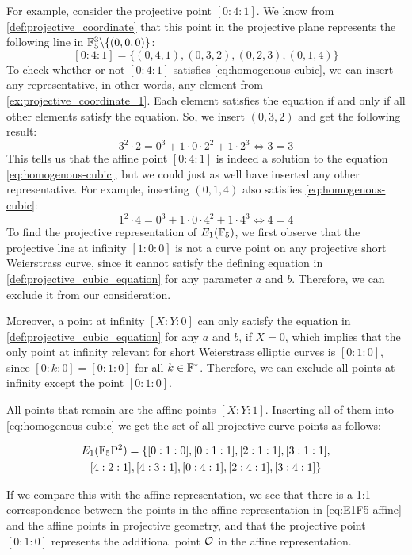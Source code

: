 \begin{example}
For example, consider the projective point $[0:4:1]$. We know from \ref{def:projective_coordinate} that this point in the projective plane represents the following line in $\mathbb{F}_5^3\backslash\{(0,0,0)\}$:
\begin{equation}
\label{ex:projective_coordinate_1}
[0:4:1] = \{(0,4,1),(0,3,2),(0,2,3),(0,1,4)\}
\end{equation} 
To check whether or not $[0:4:1]$ satisfies \ref{eq:homogenous-cubic}, we can insert any representative, in other words, any element from \ref{ex:projective_coordinate_1}. Each element satisfies the equation if and only if all other elements satisfy the equation. So, we insert $(0,3,2)$ and get the following result:
$$
3^2\cdot 2 = 0^3 + 1\cdot 0\cdot 2^2 + 1\cdot 2^3 \Leftrightarrow
3 = 3
$$
This tells us that the affine point $[0:4:1]$ is indeed a solution to the equation \ref{eq:homogenous-cubic}, but we could just as well have inserted any other representative. For example, inserting $(0,1,4)$ also satisfies \ref{eq:homogenous-cubic}: 
$$
1^2\cdot 4 = 0^3 + 1\cdot 0\cdot 4^2 + 1\cdot 4^3 \Leftrightarrow
4=4
$$
To find the projective representation of $E_1(\mathbb{F}_5)$, we first observe that the projective line at infinity $[1:0:0]$ is not a curve point on any projective short Weierstrass curve, since it cannot satisfy the defining equation in \ref{def:projective_cubic_equation} for any parameter $a$ and $b$. Therefore, we can exclude it from our consideration. 

Moreover, a point at infinity $[X:Y:0]$ can only satisfy the equation in \ref{def:projective_cubic_equation} for any $a$ and $b$, if $X=0$, which implies that the only point at infinity relevant for short Weierstrass elliptic curves is $[0:1:0]$, since $[0:k:0]= [0:1:0]$ for all $k\in\mathbb{F}^*$. Therefore, we can exclude all points at infinity except the point $[0:1:0]$.

All points that remain are the affine points $[X:Y:1]$. Inserting all of them into \ref{eq:homogenous-cubic} we get the set of all projective curve points as follows:

\begin{multline*}
\label{E1F5_projective_points_set}
E_1(\mathbb{F}_5\mathrm{P}^2)=\{[0:1:0], [0:1:1], [2:1:1], [3:1:1], \\ [4:2:1], [4:3:1], [0:4:1], [2:4:1], [3:4:1]\}
\end{multline*}

If we compare this with the affine representation, we see that there is a 1:1 correspondence between the points in the affine representation in \ref{eq:E1F5-affine} and the affine points in projective geometry, and that the projective point $[0:1:0]$ represents the additional point $\mathcal{O}$ in the affine representation.
\end{example} 

